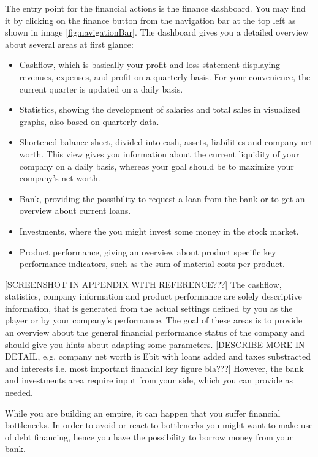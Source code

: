  The entry point for the financial actions is the finance dashboard. You may find it by clicking on the finance button from the navigation bar at the top left as shown in image \ref{fig:navigationBar}. The dashboard gives you a detailed overview about several areas at first glance:
\begin{itemize}
    \item Cashflow, which is basically your profit and loss statement displaying revenues, expenses, and profit on a quarterly basis. For your convenience, the current quarter is updated on a daily basis.
    \item Statistics, showing the development of salaries and total sales in visualized graphs, also based on quarterly data.
    \item Shortened balance sheet, divided into cash, assets, liabilities and company net worth. This view gives you information about the current liquidity of your company on a daily basis, whereas your goal should be to maximize your company's net worth.
    \item Bank, providing the possibility to request a loan from the bank or to get an overview about current loans.
    \item Investments, where the you might invest some money in the stock market.
    \item Product performance, giving an overview about product specific key performance indicators, such as the sum of material costs per product.
\end{itemize}
[SCREENSHOT IN APPENDIX WITH REFERENCE???] The cashflow, statistics, company information and product performance are solely descriptive information, that is generated from the actual settings defined by you as the player or by your company’s performance. The goal of these areas is to provide an overview about the general financial performance status of the company and should give you hints about adapting some parameters. [DESCRIBE MORE IN DETAIL, e.g. company net worth is Ebit with loans added and taxes substracted and interests i.e. most important financial key figure bla???] However, the bank and investments area require input from your side, which you can provide as needed. 

While you are building an empire, it can happen that you suffer financial bottlenecks. In order to avoid or react to bottlenecks you might want to make use of debt financing, hence you have the possibility to borrow money from your bank. 

